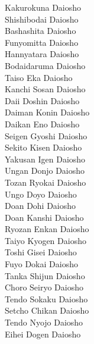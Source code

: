 \documentclass[12pt]{report}
\begin{document}
\begin{multicols*}{3}
     Kakurokuna Daiosho
  \\ Shishibodai Daiosho 
  \\ Bashashita Daiosho
  \\ Funyomitta Daiosho
  \\ Hannyatara Daiosho
  \\ Bodaidaruma Daiosho
  \\ Taiso Eka Daiosho
  \\ Kanchi Sosan Daiosho
  \\ Daii Doshin Daiosho
  \\ Daiman Konin Daiosho
  \\ Daikan Eno Daiosho
  \\ Seigen Gyoshi Daiosho
  \\ Sekito Kisen Daiosho
  \\ Yakusan Igen Daiosho
  \\ Ungan Donjo Daiosho
  \\ Tozan Ryokai Daiosho
  \\ Ungo Doyo Daiosho
  \\ Doan Dohi Daiosho
  \\ Doan Kanshi Daiosho
  \\ Ryozan Enkan Daiosho
  \\ Taiyo Kyogen Daiosho
  \\ Toshi Gisei Daiosho
  \\ Fuyo Dokai Daiosho
  \\ Tanka Shijun Daiosho
  \\ Choro Seiryo Daiosho
  \\ Tendo Sokaku Daiosho
  \\ Setcho Chikan Daiosho
  \\ Tendo Nyojo Daiosho
  \\ Eihei Dogen Daiosho

  \columnbreak


\end{multicols*}
\end{document}
